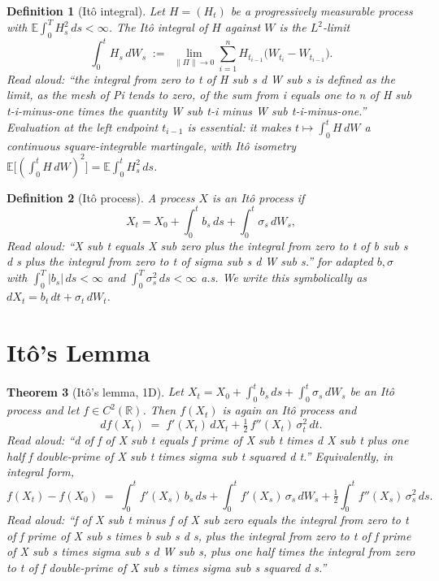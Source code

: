\documentclass[11pt]{article}
\newtheorem{theorem}{Theorem}
\newtheorem{definition}[theorem]{Definition}
\begin{document}
\begin{definition}[It\^o integral]
Let $H = (H_t)$ be a progressively measurable process with $\mathbb{E}\int_0^T H_s^2\,ds < \infty$.
The \emph{It\^o integral} of $H$ against $W$ is the $L^2$-limit
\[
  \int_0^t H_s\,dW_s \;:=\; \lim_{\|\Pi\|\to 0} \sum_{i=1}^n H_{t_{i-1}}\bigl(W_{t_i} - W_{t_{i-1}}\bigr).
\]
\emph{Read aloud:} ``the integral from zero to t of H sub s d W sub s is defined as the limit, as the mesh of Pi tends to zero, of the sum from i equals one to n of H sub t-i-minus-one times the quantity W sub t-i minus W sub t-i-minus-one.''
Evaluation at the \emph{left endpoint} $t_{i-1}$ is essential: it makes $t \mapsto \int_0^t H\,dW$
a continuous square-integrable martingale, with It\^o isometry
$\mathbb{E}\bigl[(\int_0^t H\,dW)^2\bigr] = \mathbb{E}\int_0^t H_s^2\,ds$.
\end{definition}

\begin{definition}[It\^o process]
A process $X$ is an \emph{It\^o process} if
\[
  X_t = X_0 + \int_0^t b_s\,ds + \int_0^t \sigma_s\,dW_s,
\]
\emph{Read aloud:} ``X sub t equals X sub zero plus the integral from zero to t of b sub s d s plus the integral from zero to t of sigma sub s d W sub s.''
for adapted $b, \sigma$ with $\int_0^T |b_s|\,ds < \infty$ and $\int_0^T \sigma_s^2\,ds < \infty$ a.s.
We write this symbolically as $dX_t = b_t\,dt + \sigma_t\,dW_t$.
\end{definition}

\section{It\^o's Lemma}

\begin{theorem}[It\^o's lemma, 1D]
\label{thm:ito}
Let $X_t = X_0 + \int_0^t b_s\,ds + \int_0^t \sigma_s\,dW_s$ be an It\^o process and let
$f \in C^2(\mathbb{R})$. Then $f(X_t)$ is again an It\^o process and
\[
  df(X_t) \;=\; f'(X_t)\,dX_t + \tfrac{1}{2}\,f''(X_t)\,\sigma_t^2\,dt.
\]
\emph{Read aloud:} ``d of f of X sub t equals f prime of X sub t times d X sub t plus one half f double-prime of X sub t times sigma sub t squared d t.''
Equivalently, in integral form,
\[
  f(X_t) - f(X_0) \;=\; \int_0^t f'(X_s)\,b_s\,ds + \int_0^t f'(X_s)\,\sigma_s\,dW_s
  + \tfrac{1}{2}\int_0^t f''(X_s)\,\sigma_s^2\,ds.
\]
\emph{Read aloud:} ``f of X sub t minus f of X sub zero equals the integral from zero to t of f prime of X sub s times b sub s d s, plus the integral from zero to t of f prime of X sub s times sigma sub s d W sub s, plus one half times the integral from zero to t of f double-prime of X sub s times sigma sub s squared d s.''
\end{theorem}
\end{document}
